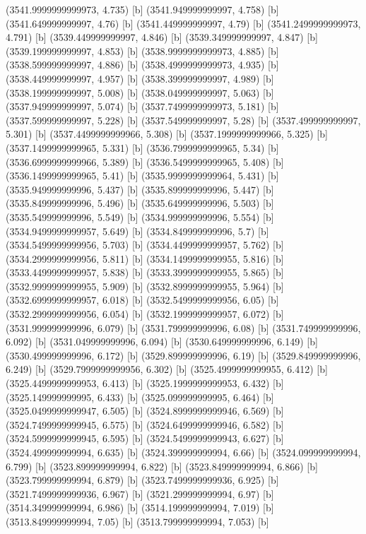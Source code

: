 {{{(3541.9999999999973, 4.735) [b] 
(3541.949999999997, 4.758) [b] 
(3541.649999999997, 4.76) [b] 
(3541.449999999997, 4.79) [b] 
(3541.2499999999973, 4.791) [b] 
(3539.449999999997, 4.846) [b] 
(3539.349999999997, 4.847) [b] 
(3539.199999999997, 4.853) [b] 
(3538.9999999999973, 4.885) [b] 
(3538.599999999997, 4.886) [b] 
(3538.4999999999973, 4.935) [b] 
(3538.449999999997, 4.957) [b] 
(3538.399999999997, 4.989) [b] 
(3538.199999999997, 5.008) [b] 
(3538.049999999997, 5.063) [b] 
(3537.949999999997, 5.074) [b] 
(3537.7499999999973, 5.181) [b] 
(3537.599999999997, 5.228) [b] 
(3537.549999999997, 5.28) [b] 
(3537.499999999997, 5.301) [b] 
(3537.4499999999966, 5.308) [b] 
(3537.1999999999966, 5.325) [b] 
(3537.1499999999965, 5.331) [b] 
(3536.7999999999965, 5.34) [b] 
(3536.6999999999966, 5.389) [b] 
(3536.5499999999965, 5.408) [b] 
(3536.1499999999965, 5.41) [b] 
(3535.9999999999964, 5.431) [b] 
(3535.949999999996, 5.437) [b] 
(3535.899999999996, 5.447) [b] 
(3535.849999999996, 5.496) [b] 
(3535.649999999996, 5.503) [b] 
(3535.549999999996, 5.549) [b] 
(3534.999999999996, 5.554) [b] 
(3534.9499999999957, 5.649) [b] 
(3534.849999999996, 5.7) [b] 
(3534.5499999999956, 5.703) [b] 
(3534.4499999999957, 5.762) [b] 
(3534.2999999999956, 5.811) [b] 
(3534.1499999999955, 5.816) [b] 
(3533.4499999999957, 5.838) [b] 
(3533.3999999999955, 5.865) [b] 
(3532.9999999999955, 5.909) [b] 
(3532.8999999999955, 5.964) [b] 
(3532.6999999999957, 6.018) [b] 
(3532.5499999999956, 6.05) [b] 
(3532.2999999999956, 6.054) [b] 
(3532.1999999999957, 6.072) [b] 
(3531.999999999996, 6.079) [b] 
(3531.799999999996, 6.08) [b] 
(3531.749999999996, 6.092) [b] 
(3531.049999999996, 6.094) [b] 
(3530.649999999996, 6.149) [b] 
(3530.499999999996, 6.172) [b] 
(3529.899999999996, 6.19) [b] 
(3529.849999999996, 6.249) [b] 
(3529.7999999999956, 6.302) [b] 
(3525.4999999999955, 6.412) [b] 
(3525.4499999999953, 6.413) [b] 
(3525.1999999999953, 6.432) [b] 
(3525.149999999995, 6.433) [b] 
(3525.099999999995, 6.464) [b] 
(3525.0499999999947, 6.505) [b] 
(3524.8999999999946, 6.569) [b] 
(3524.7499999999945, 6.575) [b] 
(3524.6499999999946, 6.582) [b] 
(3524.5999999999945, 6.595) [b] 
(3524.5499999999943, 6.627) [b] 
(3524.499999999994, 6.635) [b] 
(3524.399999999994, 6.66) [b] 
(3524.099999999994, 6.799) [b] 
(3523.899999999994, 6.822) [b] 
(3523.849999999994, 6.866) [b] 
(3523.799999999994, 6.879) [b] 
(3523.7499999999936, 6.925) [b] 
(3521.7499999999936, 6.967) [b] 
(3521.299999999994, 6.97) [b] 
(3514.349999999994, 6.986) [b] 
(3514.199999999994, 7.019) [b] 
(3513.849999999994, 7.05) [b] 
(3513.799999999994, 7.053) [b] 
}}}
